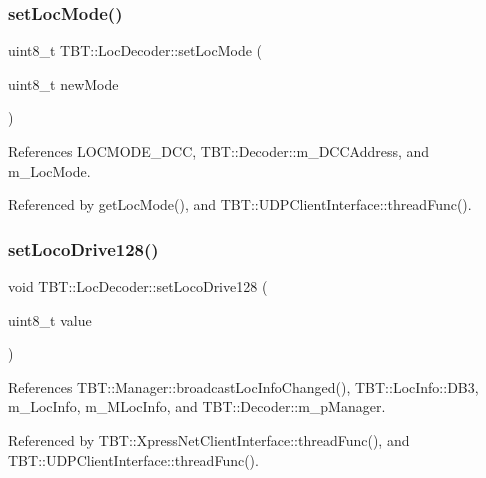 \subsubsection{\texorpdfstring{set\+Loc\+Mode()}{setLocMode()}}
{\footnotesize\ttfamily uint8\+\_\+t T\+B\+T\+::\+Loc\+Decoder\+::set\+Loc\+Mode (\begin{DoxyParamCaption}\item[{uint8\+\_\+t}]{new\+Mode }\end{DoxyParamCaption})}



References L\+O\+C\+M\+O\+D\+E\+\_\+\+D\+CC, T\+B\+T\+::\+Decoder\+::m\+\_\+\+D\+C\+C\+Address, and m\+\_\+\+Loc\+Mode.



Referenced by get\+Loc\+Mode(), and T\+B\+T\+::\+U\+D\+P\+Client\+Interface\+::thread\+Func().

\mbox{\label{classTBT_1_1LocDecoder_a9de246d419829f424e8b50c817c599ca_a9de246d419829f424e8b50c817c599ca}} 
\subsubsection{\texorpdfstring{set\+Loco\+Drive128()}{setLocoDrive128()}}
{\footnotesize\ttfamily void T\+B\+T\+::\+Loc\+Decoder\+::set\+Loco\+Drive128 (\begin{DoxyParamCaption}\item[{uint8\+\_\+t}]{value }\end{DoxyParamCaption})\hspace{0.3cm}{\ttfamily [inline]}}



References T\+B\+T\+::\+Manager\+::broadcast\+Loc\+Info\+Changed(), T\+B\+T\+::\+Loc\+Info\+::\+D\+B3, m\+\_\+\+Loc\+Info, m\+\_\+\+M\+Loc\+Info, and T\+B\+T\+::\+Decoder\+::m\+\_\+p\+Manager.



Referenced by T\+B\+T\+::\+Xpress\+Net\+Client\+Interface\+::thread\+Func(), and T\+B\+T\+::\+U\+D\+P\+Client\+Interface\+::thread\+Func().

\mbox{\label{classTBT_1_1LocDecoder_a5b0ba8089edaf920fb513e26701580bf_a5b0ba8089edaf920fb513e26701580bf}} 
